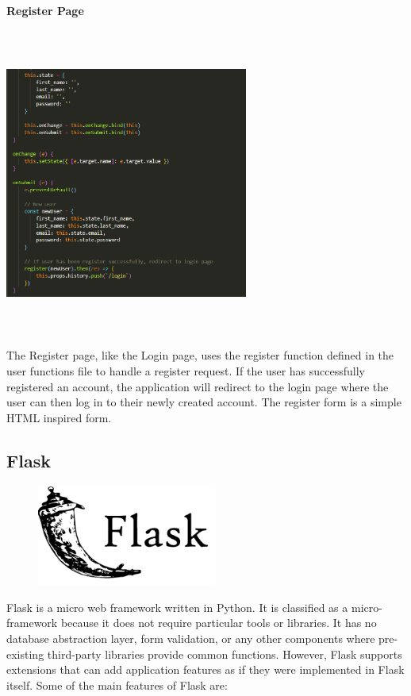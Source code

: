 \newpage
\paragraph{Register Page}
\begin{center}
    \includegraphics[width=8cm,height=10cm,keepaspectratio]{images/register1}
\end{center}
The Register page, like the Login page, uses the register function defined in the user functions file to handle a register request. If the user has successfully registered an account, the application will redirect to the login page where the user can then log in to their newly created account. The register form is a simple HTML inspired form.

\newpage
\subsection{Flask}
\par
\medskip
\begin{center}
    \includegraphics[width=8cm,height=3.3cm,keepaspectratio]{images/flask}
\end{center}
Flask is a micro web framework written in Python. It is classified as a 
micro-framework because it does not require particular tools or libraries. It 
has no database abstraction layer, form validation, or any other components 
where pre-existing third-party libraries provide common functions. However, 
Flask supports extensions that can add application features as if they were 
implemented in Flask itself. Some of the main features of Flask are:

